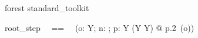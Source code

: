
\begin{zsection}
  \SECTION forest \parents standard\_toolkit
\end{zsection}

\begin{zed} [Y] \end{zed}

\begin{zed}
root\_step ~~==~~ (\lambda o: Y; n: \nat; p: Y \cross (Y \pfun Y) @ p.2~(o))
\end{zed}